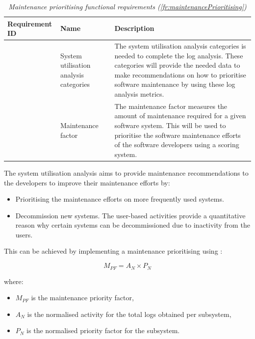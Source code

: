 \setcounter{phase}{4}
\setcounter{subphase}{0}
\begin{table}[!htb]
	\centering
	\caption[Maintenance prioritising functional requirements (\ref{fr:maintenancePrioritising})]
	{\textit{Maintenance prioritising functional requirements (\ref{fr:maintenancePrioritising})}}
	\label{tbl:ch2_maintenancePriortising}
	\begin{tabularx}{\textwidth}{|l|l|X|}
		\hline \textbf{Requirement ID} & \textbf{Name} & \textbf{Description} \\
		\hline \subphase{fr:systemUtiReq} & System utilisation analysis categories & \RaggedRight The system utilisation analysis categories is needed to complete the log analysis. These categories will provide the needed data to make recommendations on how to prioritise software maintenance by using these log analysis metrics.\\
		\hline \subphase{fr:maintenanceFactor} & Maintenance factor & \RaggedRight The maintenance factor measures the amount of maintenance required for a given software system. This will be used to prioritise the software maintenance efforts of the software developers using a scoring system. \\
		\hline
	\end{tabularx}
\end{table}

The system utilisation analysis aims to provide maintenance recommendations to the developers to improve their maintenance efforts by:

\begin{itemize}
	\item Prioritising the maintenance efforts on more frequently used systems.
	\item Decommission new systems. The user-based activities provide a quantitative reason why certain systems can be decommissioned due to inactivity from the users.
\end{itemize}

This can be achieved by implementing a maintenance prioritising using :

\begin{equation}
	\label{eq:ch2_maintenanceFactorSimplified}
	M_{PF} = A_{N} \times P_{N}
\end{equation}

where:

\begin{itemize}
	\item $M_{PF}$ is the maintenance priority factor,
	\item $A_{N}$ is the normalised activity for the total logs obtained per subsystem,
	\item $P_{N}$ is the normalised priority factor for the subsystem.
\end{itemize}


